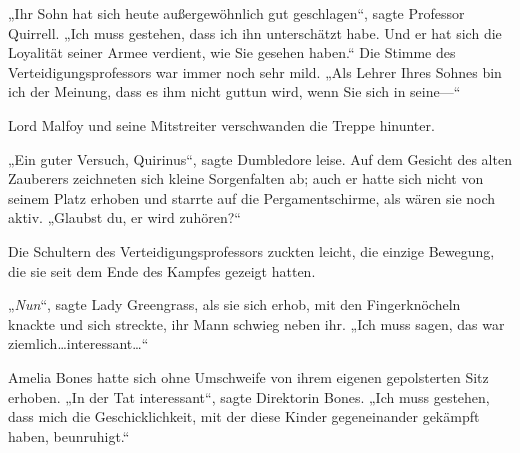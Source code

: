 „Ihr Sohn hat sich heute außergewöhnlich gut geschlagen“, sagte Professor Quirrell. „Ich muss gestehen, dass ich ihn unterschätzt habe. Und er hat sich die Loyalität seiner Armee verdient, wie Sie gesehen haben.“ Die Stimme des Verteidigungsprofessors war immer noch sehr mild. „Als Lehrer Ihres Sohnes bin ich der Meinung, dass es ihm nicht guttun wird, wenn Sie sich in seine—“

Lord Malfoy und seine Mitstreiter verschwanden die Treppe hinunter.

„Ein guter Versuch, Quirinus“, sagte Dumbledore leise. Auf dem Gesicht des alten Zauberers zeichneten sich kleine Sorgenfalten ab; auch er hatte sich nicht von seinem Platz erhoben und starrte auf die Pergamentschirme, als wären sie noch aktiv. „Glaubst du, er wird zuhören?“

Die Schultern des Verteidigungsprofessors zuckten leicht, die einzige Bewegung, die sie seit dem Ende des Kampfes gezeigt hatten.

„\emph{Nun}“, sagte Lady Greengrass, als sie sich erhob, mit den Fingerknöcheln knackte und sich streckte, ihr Mann schwieg neben ihr. „Ich muss sagen, das war ziemlich…interessant…“

Amelia Bones hatte sich ohne Umschweife von ihrem eigenen gepolsterten Sitz erhoben. „In der Tat interessant“, sagte Direktorin Bones. „Ich muss gestehen, dass mich die Geschicklichkeit, mit der diese Kinder gegeneinander gekämpft haben, beunruhigt.“

